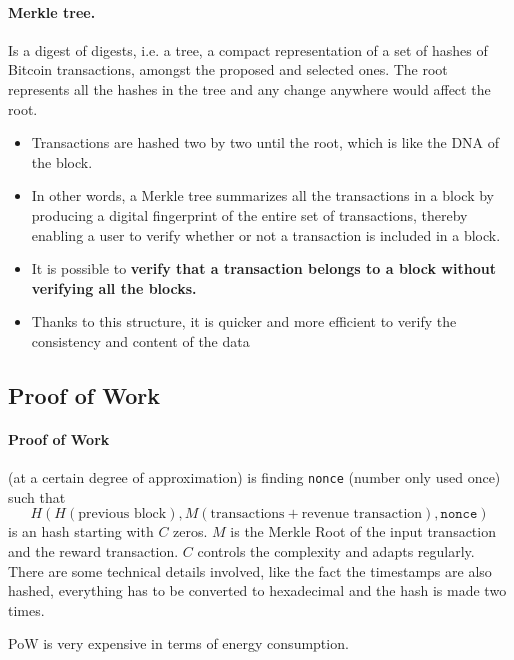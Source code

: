 \paragraph*{Merkle tree.} Is a digest of digests, i.e. a tree, a compact representation of a set of hashes of Bitcoin transactions, amongst the proposed and selected ones. The root represents all the hashes in the tree and any change anywhere would affect the root.
\begin{itemize}
	\item Transactions are hashed two by two until the root, which is like the DNA of the block.
	\item In other words, a Merkle tree summarizes all the transactions in a block by producing a digital fingerprint of the entire set of transactions, thereby enabling a user to verify whether or not a transaction is included in a block.
	\item It is possible to \textbf{verify that a transaction belongs to a block without verifying all the blocks.}
	\item Thanks to this structure, it is quicker and more efficient to verify the consistency and content of the data
\end{itemize}


\subsection{Proof of Work}

\paragraph*{Proof of Work} (at a certain degree of approximation) is finding \texttt{nonce} (number only used once) such that
\begin{equation*}
	H(H(\text{previous block}),M(\text{transactions} +\text{revenue transaction}),\texttt{nonce})
\end{equation*}
is an hash starting with $C$ zeros. $M$ is the Merkle Root of the input transaction and the reward transaction. $C$ controls the complexity and adapts regularly. There are some technical details involved, like the fact the timestamps are also hashed, everything has to be converted to hexadecimal and the hash is made two times.

PoW is very expensive in terms of energy consumption.

